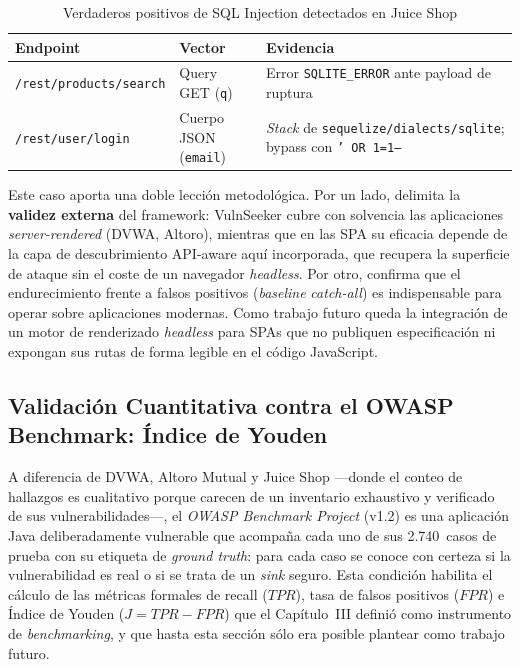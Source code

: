 \documentclass[12pt, a4paper]{article}
\begin{document}
\begin{table}[H]
    \centering
    \caption{Verdaderos positivos de SQL Injection detectados en Juice Shop}
    \label{tab:juiceshop-sqli}
    \small
    \begin{tabular}{p{3.8cm} p{2.4cm} p{5.0cm}}
        \toprule
        \textbf{Endpoint} & \textbf{Vector} & \textbf{Evidencia} \\
        \midrule
        \texttt{/rest/products/search} & Query GET (\texttt{q}) & Error \texttt{SQLITE\_ERROR} ante payload de ruptura \\
        \texttt{/rest/user/login} & Cuerpo JSON (\texttt{email}) & \textit{Stack} de \texttt{sequelize/dialects/sqlite}; bypass con \texttt{' OR 1=1--} \\
        \bottomrule
    \end{tabular}
\end{table}

Este caso aporta una doble lección metodológica. Por un lado, delimita la
\textbf{validez externa} del framework: VulnSeeker cubre con solvencia las
aplicaciones \textit{server-rendered} (DVWA, Altoro), mientras que en las SPA su
eficacia depende de la capa de descubrimiento API-aware aquí incorporada, que
recupera la superficie de ataque sin el coste de un navegador \textit{headless}.
Por otro, confirma que el endurecimiento frente a falsos positivos (\textit{baseline}
\textit{catch-all}) es indispensable para operar sobre aplicaciones modernas. Como
trabajo futuro queda la integración de un motor de renderizado \textit{headless}
para SPAs que no publiquen especificación ni expongan sus rutas de forma legible
en el código JavaScript.

\subsection{Validación Cuantitativa contra el OWASP Benchmark: Índice de Youden}

A diferencia de DVWA, Altoro Mutual y Juice Shop ---donde el conteo de hallazgos
es cualitativo porque carecen de un inventario exhaustivo y verificado de sus
vulnerabilidades---, el \textit{OWASP Benchmark Project} (v1.2) es una aplicación
Java deliberadamente vulnerable que acompaña cada uno de sus 2.740~casos de prueba
con su etiqueta de \textit{ground truth}: para cada caso se conoce con certeza si
la vulnerabilidad es real o si se trata de un \textit{sink} seguro. Esta condición
habilita el cálculo de las métricas formales de recall ($TPR$), tasa de falsos
positivos ($FPR$) e Índice de Youden ($J = TPR - FPR$) que el Capítulo~III definió
como instrumento de \textit{benchmarking}, y que hasta esta sección sólo era
posible plantear como trabajo futuro.
\end{document}
